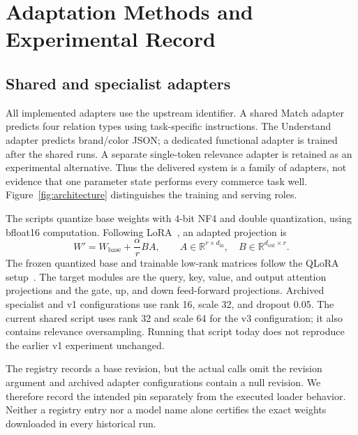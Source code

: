 \section{Adaptation Methods and Experimental Record}
\label{sec:methods}
\subsection{Shared and specialist adapters}
All implemented adapters use the upstream  identifier. A shared Match adapter predicts four relation types using task-specific instructions. The Understand adapter predicts brand/color JSON; a dedicated functional adapter is trained after the shared runs. A separate single-token relevance adapter is retained as an experimental alternative. Thus the delivered system is a family of adapters, not evidence that one parameter state performs every commerce task well. Figure~\ref{fig:architecture} distinguishes the training and serving roles.



The scripts quantize base weights with 4-bit NF4 and double quantization, using bfloat16 computation. Following LoRA~\cite{lora}, an adapted projection is
\begin{equation}
 W' = W_{\mathrm{base}} + \frac{\alpha}{r}BA,
 \qquad A\in\mathbb{R}^{r\times d_{\mathrm{in}}},\quad B\in\mathbb{R}^{d_{\mathrm{out}}\times r}.
\end{equation}
The frozen quantized base and trainable low-rank matrices follow the QLoRA setup~\cite{qlora}. The target modules are the query, key, value, and output attention projections and the gate, up, and down feed-forward projections. Archived specialist and v1 configurations use rank 16, scale 32, and dropout 0.05. The current shared script uses rank 32 and scale 64 for the v3 configuration; it also contains relevance oversampling. Running that script today does not reproduce the earlier v1 experiment unchanged.

The registry records a base revision, but the actual  calls omit the revision argument and archived adapter configurations contain a null revision. We therefore record the intended pin separately from the executed loader behavior. Neither a registry entry nor a model name alone certifies the exact weights downloaded in every historical run.

